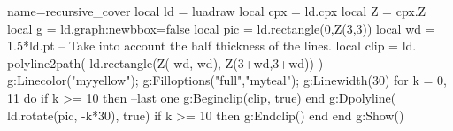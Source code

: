 \documentclass[tikz,border=5pt]{standalone}
\begin{document}
\begin{luadraw}{name=recursive_cover}
local ld = luadraw
local cpx = ld.cpx
local Z = cpx.Z
local g = ld.graph:new{bbox=false}
local pic = ld.rectangle(0,Z(3,3))
local wd = 1.5*ld.pt -- Take into account the half thickness of the lines.
local clip = ld. polyline2path( ld.rectangle(Z(-wd,-wd), Z(3+wd,3+wd)) )
g:Linecolor("myyellow"); g:Filloptions("full","myteal"); g:Linewidth(30)
for k = 0, 11 do
    if k >= 10 then --last one
        g:Beginclip(clip, true)
    end
    g:Dpolyline( ld.rotate(pic, -k*30), true)
    if k >= 10 then g:Endclip() end
end
g:Show()
\end{luadraw}
\end{document}
